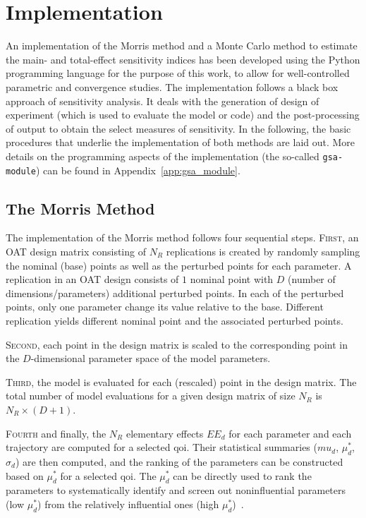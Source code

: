 \section{Implementation}\label{sec:sa_implementation}

An implementation of the Morris method and a Monte Carlo method to estimate the main- and total-effect sensitivity indices has been developed using the Python programming language 
for the purpose of this work, to allow for well-controlled parametric and convergence studies.
The implementation follows a black box approach of sensitivity analysis. 
It deals with the generation of design of experiment (which is used to evaluate the model or code) and the post-processing of output to obtain the select measures of sensitivity.
In the following, the basic procedures that underlie the implementation of both methods are laid out.
More details on the programming aspects of the implementation (the so-called \texttt{gsa-module}) can be found in Appendix~\ref{app:gsa_module}.

\subsection{The Morris Method}\label{sub:sa_morris}

The implementation of the Morris method follows four sequential steps. 
\textsc{First}, an OAT design matrix consisting of $N_R$ replications is created by randomly sampling the nominal (base) points as well as the perturbed points for each parameter.
A replication in an OAT design consists of $1$ nominal point with $D$ (number of dimensions/parameters) additional perturbed points.
In each of the perturbed points, only one parameter change its value relative to the base.
Different replication yields different nominal point and the associated perturbed points.

\textsc{Second}, each point in the design matrix is scaled to the corresponding point in the $D$-dimensional parameter space of the model parameters.

\textsc{Third}, the model is evaluated for each (rescaled) point in the design matrix. The total number of model evaluations for a given design matrix of size $N_R$ is $N_R \times (D + 1)$.

\textsc{Fourth} and finally, the $N_R$ elementary effects $EE_d$ for each parameter and each trajectory are computed for a selected \gls{qoi}.
Their statistical summaries ($mu_d$, $\mu_d^*$, $\sigma_d$) are then computed, 
and the ranking of the parameters can be constructed based on $\mu_d^*$ for a selected \gls{qoi}.
The $\mu_d^*$ can be directly used to rank the parameters to systematically identify 
and screen out noninfluential parameters (low $\mu_d^*$) from the relatively influential ones (high $\mu_d^*$)~\cite{Campolongo2007}.


